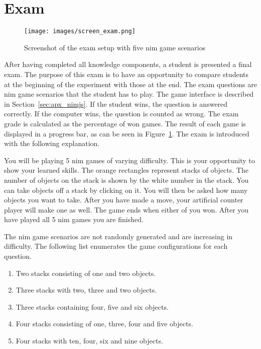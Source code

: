 \section{Exam}
\label{sec:setup_exam}
\begin{figure}[ht]
    \centering
    \texttt{[image: images/screen\_exam.png]}
    \caption{Screenshot of the exam setup with five nim game scenarios}
    \label{fig:screen_exam}
\end{figure}
After having completed all knowledge components, a student is presented a final
exam. The purpose of this exam is to have an opportunity to compare students at
the beginning of the experiment with those at the end. The exam questions are
nim game scenarios that the student has to play. The game interface is
described in Section~\ref{sec:apx_nimjs}. If the student wins, the
question is answered correctly. If the computer wins, the question is counted
as wrong. The exam grade is calculated as the percentage of won games. The result
of each game is displayed in a progress bar, as can be seen in
Figure~\ref{fig:screen_exam}. The exam is introduced with the following explanation.
\begin{framed}\noindent
	You will be playing 5 nim games of varying difficulty. This is your
	opportunity to show your learned skills. The orange rectangles represent
	stacks of objects. The number of objects on the stack is shown by the white
	number in the stack. You can take objects off a stack by clicking on it.
	You will then be asked how many objects you want to take. After you have
	made a move, your artificial counter player will make one as well. The game
	ends when either of you won.
	After you have played all 5 nim games you are finished.
\end{framed}
\noindent The nim game scenarios are not randomly generated and are increasing in
difficulty. The following list enumerates the game configurations for each
question.
\begin{enumerate}
	\item Two stacks consisting of one and two objects.
	\item Three stacks with two, three and two objects.
	\item Three stacks containing four, five and six objects.
	\item Four stacks consisting of one, three, four and five objects.
	\item Four stacks with ten, four, six and nine objects.
\end{enumerate}
